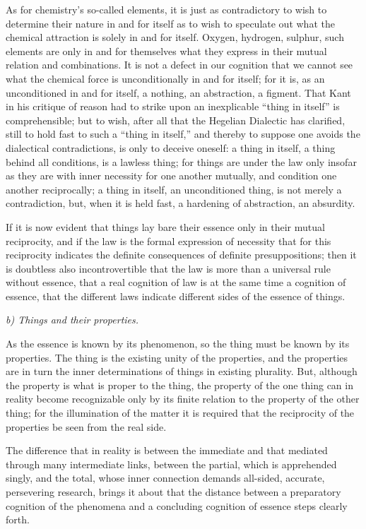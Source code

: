 \documentclass[12pt]{book}
\begin{document}
As for chemistry's so-called elements, it is just as contradictory to wish to
determine their nature in and for itself as to wish to speculate out what the
chemical attraction is solely in and for itself. Oxygen, hydrogen, sulphur, such
elements are only in and for themselves what they express in their mutual relation
and combinations. It is not a defect in our cognition that we cannot see what the
chemical force is unconditionally in and for itself; for it is, as an unconditioned
in and for itself, a nothing, an abstraction, a figment.
That Kant in his critique of reason had to strike upon an inexplicable ``thing in
itself'' is comprehensible; but to wish, after all that the Hegelian Dialectic has
clarified, still to hold fast to such a ``thing in itself,'' and thereby to suppose
one avoids the dialectical contradictions, is only to deceive oneself: a thing in
itself, a thing behind all conditions, is a lawless thing; for things are under the
law only insofar as they are with inner necessity for one another mutually, and
condition one another reciprocally; a thing in itself, an unconditioned thing, is
not merely a contradiction, but, when it is held fast, a hardening of abstraction,
an absurdity.

If it is now evident that things lay bare their essence only in their mutual
reciprocity, and if the law is the formal expression of necessity that for this
reciprocity indicates the definite consequences of definite presuppositions; then
it is doubtless also incontrovertible that the law is more than a universal rule
without essence, that a real cognition of law is at the same time a cognition of
essence, that the different laws indicate different sides of the essence of things.

\emph{b) Things and their properties.}

As the essence is known by its phenomenon, so the thing must be known by its
properties. The thing is the existing unity of the properties, and the properties
are in turn the inner determinations of things in existing plurality. But, although
the property is what is proper to the thing, the property of the one thing can in
reality become recognizable only by its finite relation to the property of the
other thing; for the illumination of the matter it is required that the reciprocity
of the properties be seen from the real side.

The difference that in reality is between the immediate and that mediated through
many intermediate links, between the partial, which is apprehended singly, and the
total, whose inner connection demands all-sided, accurate, persevering research,
brings it about that the distance between a preparatory
cognition of the phenomena and a concluding cognition of essence steps clearly
forth.
\end{document}
